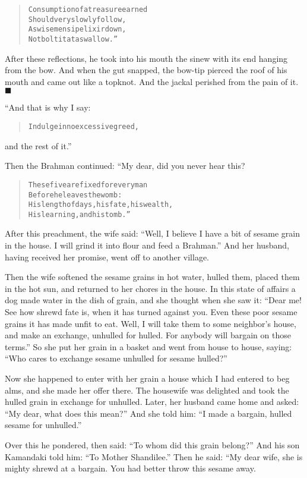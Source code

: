 \documentclass[article, twoside, 14pt]{memoir}
\newcommand{\qed}{\hfill \ensuremath{\blacksquare}}
\renewenvironment{verbatim}{%
\begin{quote}%
\vskip -10pt%
\begin{alltt}\normalfont\large}{\end{alltt}%
\end{quote}%
\vskip -10pt
} %
\begin{document}
\begin{verbatim}
Consumption of a treasure earned
    Should very slowly follow,
As wise men sip elixir down,
    Not bolt it at a swallow.”
\end{verbatim}
After these reflections, he took into his mouth the sinew with its
end hanging from the bow. And when the gut snapped, the bow-tip
pierced the roof of his mouth and came out like a topknot. And the
jackal perished from the pain of it.\hyperref[s40]{\qed}

“And that is why I say:

\begin{verbatim}
Indulge in no excessive greed,
\end{verbatim}
and the rest of it.”

Then the Brahman continued: “My dear, did you never hear this?

\begin{verbatim}
These five are fixed for every man
    Before he leaves the womb:
His length of days, his fate, his wealth,
    His learning, and his tomb.”
\end{verbatim}
After this preachment, the wife said:
``Well, I believe I have a bit of sesame grain in the house. I will grind it into flour and feed a Brahman.''
And her husband, having received her promise, went off to another
village.

Then the wife softened the sesame grains in hot water, hulled
them, placed them in the hot sun, and returned to her chores in the
house. In this state of affairs a dog made water in the dish of
grain, and she thought when she saw it:
``Dear me! See how shrewd fate is, when it has turned against you. Even these poor sesame grains it has made unfit to eat. Well, I will take them to some neighbor's house, and make an exchange, unhulled for hulled. For anybody will bargain on those terms.''
So she put her grain in a basket and went from house to house,
saying:
``Who cares to exchange sesame unhulled for sesame hulled?''

Now she happened to enter with her grain a house which I had
entered to beg alms, and she made her offer there. The housewife
was delighted and took the hulled grain in exchange for unhulled.
Later, her husband came home and asked:
``My dear, what does this mean?'' And she told him:
``I made a bargain, hulled sesame for unhulled.''

Over this he pondered, then said:
``To whom did this grain belong?'' And his son Kamandaki told him:
``To Mother Shandilee.'' Then he said: “My dear wife, she is mighty
shrewd at a bargain. You had better throw this sesame away.
\end{document}
